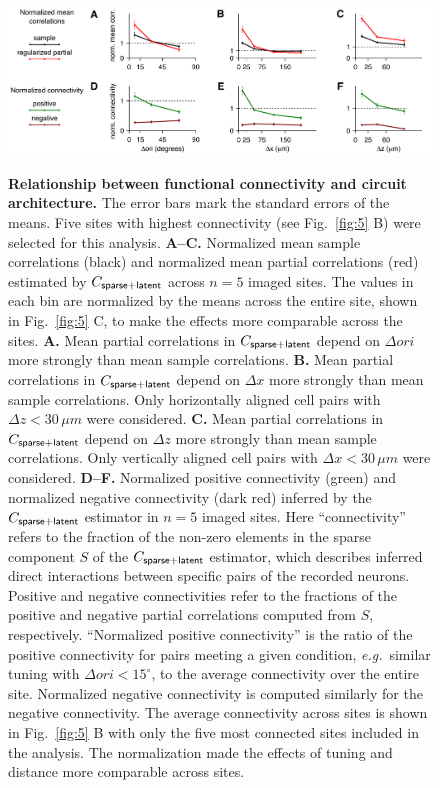 \begin{figure}
\begin{fullpage}
        \begin{center}
        \includegraphics[width=\textwidth]{./figures/OrientationAndDistance.pdf}
        \end{center}
\begin{caption}
{\bf Relationship between functional connectivity and circuit architecture.} 
The error bars mark the standard errors of the means. Five sites with highest connectivity (see Fig.~\ref{fig:5} B) were selected for this analysis.
{\bf A--C.} Normalized mean sample correlations (black) and normalized mean partial correlations (red) estimated by $C_{\sf sparse+latent}$ across $n=5$ imaged sites. The values in each bin are normalized by the means across the entire site, shown in Fig.~\ref{fig:5} C, to make the effects more comparable across the sites.
{\bf A.} Mean partial correlations in $C_{\sf sparse+latent}$ depend on $\Delta ori$ more strongly than mean sample correlations.
{\bf B.} Mean partial correlations in $C_{\sf sparse+latent}$ depend on $\Delta x$ more strongly than mean sample correlations. Only horizontally aligned cell pairs with $\Delta z<30\,\mu m$ were considered.
{\bf C.} Mean partial correlations in $C_{\sf sparse+latent}$ depend on $\Delta z$ more strongly than mean sample correlations. Only vertically aligned cell pairs with $\Delta x<30\,\mu m$ were considered.    {\bf D--F.} Normalized positive connectivity (green) and normalized negative connectivity (dark red) inferred by the $C_{\sf sparse+latent}$ estimator in $n=5$ imaged sites.
Here ``connectivity'' refers to the fraction of the non-zero elements in the sparse component $S$ of the $C_{\sf sparse+latent}$ estimator, which describes inferred direct interactions between specific pairs of the recorded neurons. Positive and negative connectivities refer to the fractions of the positive and negative partial correlations computed from  $S$, respectively.  ``Normalized positive connectivity'' is the ratio of the positive connectivity for pairs meeting a given condition, \emph{e.g.}~similar tuning with $\Delta ori <15^{\circ}$, to the average connectivity over the entire site.  Normalized negative connectivity is computed similarly for the negative connectivity.  The average connectivity across sites is shown in Fig.~\ref{fig:5} B with only the five most connected sites included in the analysis.  The normalization made the effects of tuning and distance more comparable across sites.

\end{caption}
\end{fullpage}
\end{figure}
